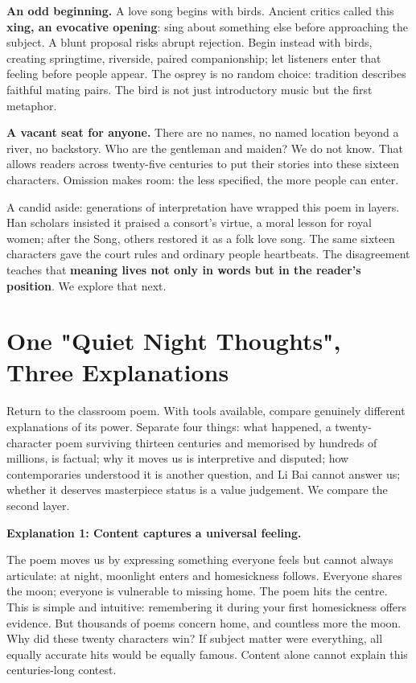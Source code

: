 \textbf{An odd beginning.} A love song begins with birds. Ancient critics called this \textbf{xing, an evocative opening}: sing about something else before approaching the subject. A blunt proposal risks abrupt rejection. Begin instead with birds, creating springtime, riverside, paired companionship; let listeners enter that feeling before people appear. The osprey is no random choice: tradition describes faithful mating pairs. The bird is not just introductory music but the first metaphor.

\textbf{A vacant seat for anyone.} There are no names, no named location beyond a river, no backstory. Who are the gentleman and maiden? We do not know. That allows readers across twenty-five centuries to put their stories into these sixteen characters. Omission makes room: the less specified, the more people can enter.

A candid aside: generations of interpretation have wrapped this poem in layers. Han scholars insisted it praised a consort's virtue, a moral lesson for royal women; after the Song, others restored it as a folk love song. The same sixteen characters gave the court rules and ordinary people heartbeats. The disagreement teaches that \textbf{meaning lives not only in words but in the reader's position}. We explore that next.

\section[One Poem, Three Explanations]{One "Quiet Night Thoughts", Three Explanations}
Return to the classroom poem. With tools available, compare genuinely different explanations of its power. Separate four things: what happened, a twenty-character poem surviving thirteen centuries and memorised by hundreds of millions, is factual; why it moves us is interpretive and disputed; how contemporaries understood it is another question, and Li Bai cannot answer us; whether it deserves masterpiece status is a value judgement. We compare the second layer.

\textbf{Explanation 1: Content captures a universal feeling.}

The poem moves us by expressing something everyone feels but cannot always articulate: at night, moonlight enters and homesickness follows. Everyone shares the moon; everyone is vulnerable to missing home. The poem hits the centre. This is simple and intuitive: remembering it during your first homesickness offers evidence. But thousands of poems concern home, and countless more the moon. Why did these twenty characters win? If subject matter were everything, all equally accurate hits would be equally famous. Content alone cannot explain this centuries-long contest.

